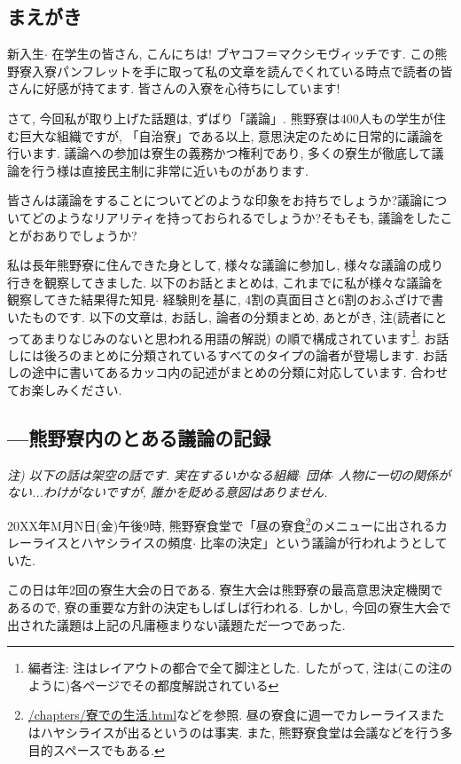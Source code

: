 \documentclass[10pt,b5jsbook,dvips,dvipdfmx,openany]{jsbook}
\theoremstyle{definition}
\begin{document}
		\subsection{まえがき}
		新入生$ \cdot $ 在学生の皆さん, こんにちは! ブヤコフ＝マクシモヴィッチです. この熊野寮入寮パンフレットを手に取って私の文章を読んでくれている時点で読者の皆さんに好感が持てます. 皆さんの入寮を心待ちにしています!

		さて, 今回私が取り上げた話題は, ずばり「議論」. 熊野寮は400人もの学生が住む巨大な組織ですが, 「自治寮」である以上, 意思決定のために日常的に議論を行います. 議論への参加は寮生の義務かつ権利であり, 多くの寮生が徹底して議論を行う様は直接民主制に非常に近いものがあります.

		皆さんは議論をすることについてどのような印象をお持ちでしょうか?議論についてどのようなリアリティを持っておられるでしょうか?そもそも, 議論をしたことがおありでしょうか?

		私は長年熊野寮に住んできた身として, 様々な議論に参加し, 様々な議論の成り行きを観察してきました. 以下のお話とまとめは, これまでに私が様々な議論を観察してきた結果得た知見$ \cdot $ 経験則を基に, 4割の真面目さと6割のおふざけで書いたものです. 以下の文章は, お話し, 論者の分類まとめ, あとがき, 注(読者にとってあまりなじみのないと思われる用語の解説) の順で構成されています\footnote{編者注: 注はレイアウトの都合で全て脚注とした. したがって, 注は(この注のように)各ページでその都度解説されている}. お話しには後ろのまとめに分類されているすべてのタイプの論者が登場します. お話しの途中に書いてあるカッコ内の記述がまとめの分類に対応しています. 合わせてお楽しみください.

\small
		\subsection{---熊野寮内のとある議論の記録}
		\small
		\emph{注) 以下の話は架空の話です. 実在するいかなる組織$ \cdot $ 団体$ \cdot $ 人物に一切の関係がない...わけがないですが, 誰かを貶める意図はありません. }

		20XX年M月N日(金)午後9時, 熊野寮食堂で「昼の寮食\footnote{\url{/chapters/寮での生活.html}などを参照. 昼の寮食に週一でカレーライスまたはハヤシライスが出るというのは事実. また, 熊野寮食堂は会議などを行う多目的スペースでもある. }のメニューに出されるカレーライスとハヤシライスの頻度$ \cdot $ 比率の決定」という議論が行われようとしていた.

		この日は年2回の寮生大会の日である. 寮生大会は熊野寮の最高意思決定機関であるので, 寮の重要な方針の決定もしばしば行われる. しかし, 今回の寮生大会で出された議題は上記の凡庸極まりない議題ただ一つであった.
\end{document}
